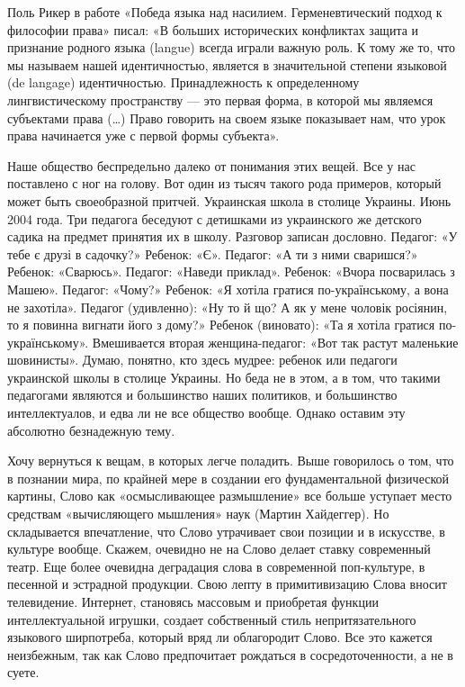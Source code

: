 Поль Рикер в работе «Победа языка над насилием. Герменевтический подход к
философии права» писал: «В больших исторических конфликтах защита и признание
родного языка (langue) всегда играли важную роль. К тому же то, что мы называем
нашей идентичностью, является в значительной степени языковой (de langage)
идентичностью. Принадлежность к определенному лингвистическому пространству —
это первая форма, в которой мы являемся субъектами права (…) Право говорить на
своем языке показывает нам, что урок права начинается уже с первой формы
субъекта».

Наше общество беспредельно далеко от понимания этих вещей. Все у нас поставлено
с ног на голову. Вот один из тысяч такого рода примеров, который может быть
своеобразной притчей. Украинская школа в столице Украины. Июнь 2004 года. Три
педагога беседуют с детишками из украинского же детского садика на предмет
принятия их в школу. Разговор записан дословно. Педагог: «У тебе є друзі в
садочку?» Ребенок: «Є». Педагог: «А ти з ними сваришся?» Ребенок: «Сварюсь».
Педагог: «Наведи приклад». Ребенок: «Вчора посварилась з Машею». Педагог:
«Чому?» Ребенок: «Я хотіла гратися по-українському, а вона не захотіла».
Педагог (удивленно): «Ну то й що? А як у мене чоловік росіянин, то я повинна
вигнати його з дому?» Ребенок (виновато): «Та я хотіла гратися
по-українському». Вмешивается вторая женщина-педагог: «Вот так растут маленькие
шовинисты». Думаю, понятно, кто здесь мудрее: ребенок или педагоги украинской
школы в столице Украины. Но беда не в этом, а в том, что такими педагогами
являются и большинство наших политиков, и большинство интеллектуалов, и едва ли
не все общество вообще. Однако оставим эту абсолютно безнадежную тему.

Хочу вернуться к вещам, в которых легче поладить. Выше говорилось о том, что в
познании мира, по крайней мере в создании его фундаментальной физической
картины, Слово как «осмысливающее размышление» все больше уступает место
средствам «вычисляющего мышления» наук (Мартин Хайдеггер). Но складывается
впечатление, что Слово утрачивает свои позиции и в искусстве, в культуре
вообще. Скажем, очевидно не на Слово делает ставку современный театр. Еще более
очевидна деградация слова в современной поп-культуре, в песенной и эстрадной
продукции. Свою лепту в примитивизацию Слова вносит телевидение. Интернет,
становясь массовым и приобретая функции интеллектуальной игрушки, создает
собственный стиль непритязательного языкового ширпотреба, который вряд ли
облагородит Слово. Все это кажется неизбежным, так как Слово предпочитает
рождаться в сосредоточенности, а не в суете.

